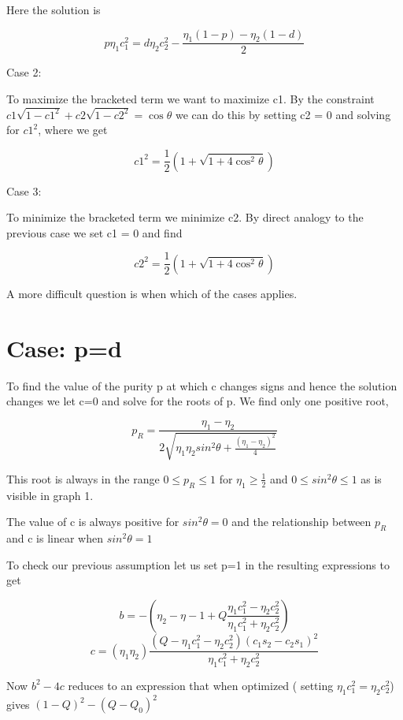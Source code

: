 \documentclass[12pt,oneside,english,reqno]{amsbook}
\numberwithin{section}{chapter}
\numberwithin{equation}{section}
\numberwithin{figure}{section}
\begin{document}
Here the solution is

\[ p\eta_1 c_1^2 = d\eta_2 c_2^2 - \frac{\eta_1(1-p) - \eta_2(1-d)}{2}\]

Case 2:

To maximize the bracketed term we want to maximize c1.  By the constraint  $c1 \sqrt{1-c1^2} + c2 \sqrt{1-c2^2} = \cos \theta$ we can do this by setting c2 = 0 and solving for $c1^2$, where we get

\[c1^2 = \frac{1}{2}(1 + \sqrt{1 + 4 \cos ^2 \theta})\]

Case 3:

To minimize the bracketed term we minimize c2.  By direct analogy to the previous case we set c1 = 0 and find

\[c2^2 = \frac{1}{2}(1 + \sqrt{1 + 4 \cos ^2 \theta})\]

A more difficult question is when which of the cases applies.

\section{Case: p=d}


To find the value of the purity p at which c changes signs and hence the solution changes we let c=0 and solve for the roots of p.  We find only one positive root,

\[p_R = \frac{\eta_1 - \eta_2}{2\sqrt{\eta_1\eta_2 sin^2 \theta + \frac{(\eta_1 -\eta_2)^2}{4}}}\]

This root is always in the range $0 \leq p_R \leq 1$ for $\eta_1 \geq \frac{1}{2}$ and $0 \leq sin^2 \theta \leq 1$ as is visible in graph 1.

The value of c is always positive for $sin^2 \theta = 0$ and the relationship between $p_R$ and c is linear when $sin^2 \theta = 1$

To check our previous assumption let us set p=1 in the resulting expressions to get

\[b = -(\eta_2 - \eta-1 +Q \frac{\eta_1 c_1^2 - \eta_2 c_2^2}{\eta_1c_1^2 +\eta_2 c_2^2})\]
\[c = (\eta_1\eta_2)\frac{(Q - \eta_1c_1^2 - \eta_2 c_2^2 )(c_1s_2 -c_2s_1)^2}{\eta_1c_1^2 +\eta_2 c_2^2}\]

Now $b^2 -4c$ reduces to an expression that when optimized ( setting $\eta_1 c_1^2 = \eta_2 c_2^2$) gives $(1-Q)^2- (Q-Q_0)^2$
\end{document}
